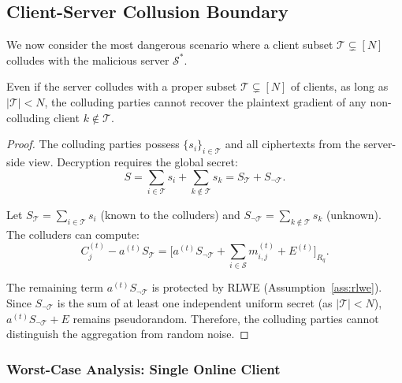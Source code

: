 \subsection{Client-Server Collusion Boundary}
\label{ssec:collusion}

We now consider the most dangerous scenario where a client subset $\mathcal{T} \subsetneq [N]$ colludes with the malicious server $\mathcal{S}^*$.

\begin{theorem}
\label{thm:partial-collusion}
Even if the server colludes with a proper subset $\mathcal{T} \subsetneq [N]$ of clients, as long as $|\mathcal{T}| < N$, the colluding parties cannot recover the plaintext gradient of any non-colluding client $k \notin \mathcal{T}$.
\end{theorem}

\begin{proof}
The colluding parties possess $\{s_i\}_{i \in \mathcal{T}}$ and all ciphertexts from the server-side view. Decryption requires the global secret:
\begin{equation}
    S = \sum_{i \in \mathcal{T}} s_i + \sum_{k \notin \mathcal{T}} s_k = S_{\mathcal{T}} + S_{\neg\mathcal{T}}.
\end{equation}

Let $S_{\mathcal{T}} = \sum_{i \in \mathcal{T}} s_i$ (known to the colluders) and $S_{\neg\mathcal{T}} = \sum_{k \notin \mathcal{T}} s_k$ (unknown). The colluders can compute:
\begin{equation}
    C_j^{(t)} - a^{(t)} S_{\mathcal{T}} = \bigl[ a^{(t)} S_{\neg\mathcal{T}} + \sum_{i \in \mathcal{S}} m_{i,j}^{(t)} + E^{(t)} \bigr]_{R_q}.
\end{equation}

The remaining term $a^{(t)} S_{\neg\mathcal{T}}$ is protected by RLWE (Assumption~\ref{ass:rlwe}). Since $S_{\neg\mathcal{T}}$ is the sum of at least one independent uniform secret (as $|\mathcal{T}| < N$), $a^{(t)} S_{\neg\mathcal{T}} + E$ remains pseudorandom. Therefore, the colluding parties cannot distinguish the aggregation from random noise.
\end{proof}

\subsubsection{Worst-Case Analysis: Single Online Client}

